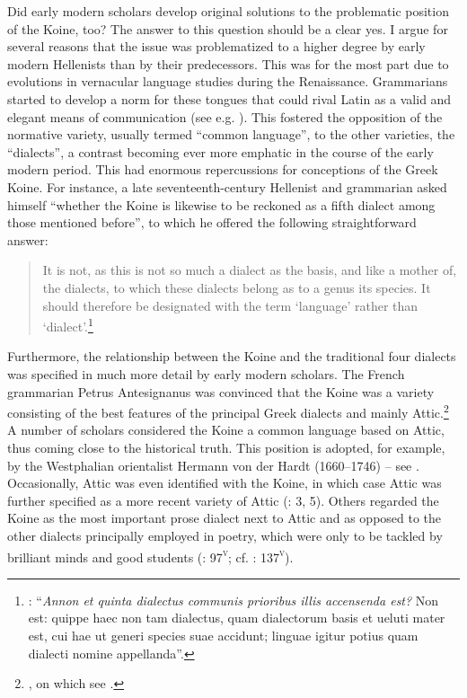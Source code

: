 Did early modern scholars develop original solutions to the problematic position of the Koine, too? The answer to this question should be a clear yes. I argue for several reasons that the issue was problematized to a higher degree by early modern Hellenists than by their predecessors. This was for the most part due to evolutions in vernacular language studies during the Renaissance. Grammarians started to develop a norm for these tongues that could rival Latin as a valid and elegant means of communication (see e.g. \citealt{Giard1992}). This fostered the opposition of the normative variety, usually termed “common language”, to the other varieties, the “dialects”, a contrast becoming ever more emphatic in the course of the early modern period. This had enormous repercussions for conceptions of the Greek Koine. For instance, a late seventeenth-century Hellenist and grammarian asked himself “whether the Koine is likewise to be reckoned as a fifth dialect among those mentioned before”, to which he offered the following straightforward answer:

\begin{quote}
It is not, as this is not so much a dialect as the basis, and like a mother of, the dialects, to which these dialects belong as to a genus its species. It should therefore be designated with the term ‘language’ rather than ‘dialect’.\footnote{\citet[495]{Ursin1691}: “\textit{Annon et quinta dialectus communis prioribus illis accensenda est?} Non est: quippe haec non tam dialectus, quam dialectorum basis et ueluti mater est, cui hae ut generi species suae accidunt; linguae igitur potius quam dialecti nomine appellanda”.}
\end{quote}

Furthermore, the relationship between the Koine and the traditional four dialects was specified in much more detail by early modern scholars. The French grammarian Petrus Antesignanus was convinced that the Koine was a variety consisting of the best features of the principal Greek dialects and mainly Attic.\footnote{\citet[12--13]{Antesignanus1554}, on which see \citet[130--131]{VanRooy2016c}.} A number of scholars considered the Koine a common language based on Attic, thus coming close to the historical truth. This position is adopted, for example, by the Westphalian orientalist Hermann von der Hardt (1660–1746) – see \citet[17--18]{Von1705}. Occasionally, Attic was even identified with the Koine, in which case Attic was further specified as a more recent variety of Attic (\citealt{Georgi1733}: 3, 5). Others regarded the Koine as the most important prose dialect next to Attic and as opposed to the other dialects principally employed in poetry, which were only to be tackled by brilliant minds and good students (\citealt{Vives1531}: 97\textsc{\textsuperscript{v}}; cf. \citealt{Vuidius1569}: 137\textsc{\textsuperscript{v}}).

